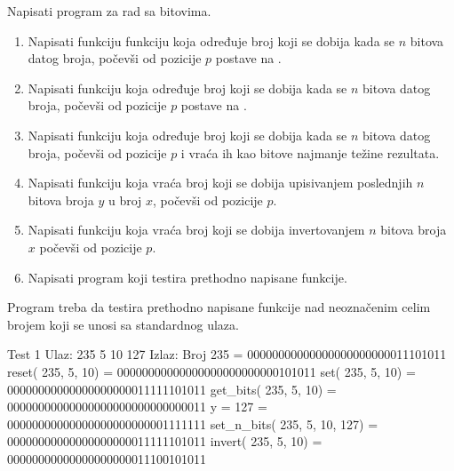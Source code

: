 \begin{Exercise}[label=204]
Napisati program za rad sa bitovima.
\begin{enumerate}
\item Napisati funkciju funkciju koja određuje broj koji se dobija kada se $n$ bitova datog broja, počevši od pozicije $p$ postave na .
\item Napisati funkciju koja određuje broj koji se dobija kada se $n$ bitova datog broja, počevši od pozicije $p$ postave na .
\item Napisati funkciju koja određuje broj koji se dobija kada se $n$ bitova datog broja, počevši od pozicije $p$ i vraća ih kao bitove najmanje težine rezultata.
\item Napisati funkciju koja vraća broj koji se dobija upisivanjem poslednjih $n$ bitova broja $y$ u broj $x$, počevši od pozicije $p$.
\item Napisati funkciju koja vraća broj koji se dobija invertovanjem $n$ bitova broja $x$ počevši od pozicije $p$.
\item Napisati program koji testira prethodno napisane funkcije.
\end{enumerate}
Program treba da testira prethodno napisane funkcije nad neoznačenim celim brojem koji se unosi sa standardnog ulaza.

\begin{maxitest}
\begin{test}{Test 1}
Ulaz:   235 5 10 127  
Izlaz:  
  Broj   235                          = 00000000000000000000000011101011
  reset(  235,    5,   10)            = 00000000000000000000000000101011
  set(  235,    5,   10)              = 00000000000000000000011111101011
  get_bits(  235,    5,   10)         = 00000000000000000000000000000011
  y =                             127 = 00000000000000000000000001111111
  set_n_bits(  235,    5,   10,  127) = 00000000000000000000011111101011
  invert(  235,    5,   10)           = 00000000000000000000011100101011
\end{test}
\end{maxitest}

\end{Exercise}
\begin{Answer}[ref=204]
\end{Answer}


